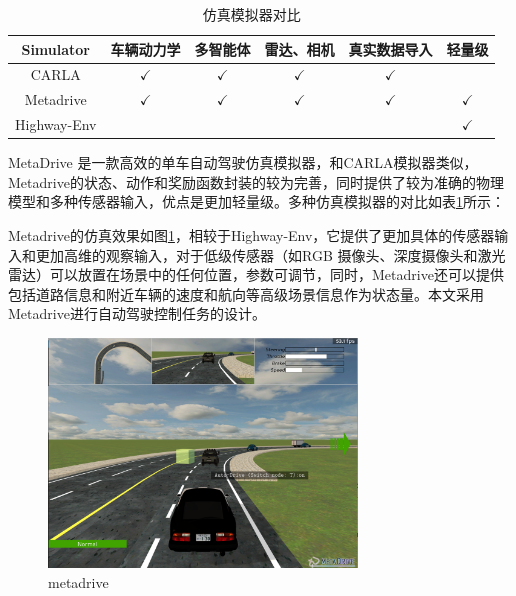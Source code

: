 \begin{table}[htbp]
    \caption{仿真模拟器对比}\label{仿真模拟器对比}
    \centering
    \renewcommand\arraystretch{1.5}
    \begin{tabular}{|c|c|c|c|c|c|}
    \hline
    Simulator   & 车辆动力学        & 多智能体       & 雷达、相机       & 真实数据导入       & 轻量级          \\ \hline
    CARLA\cite{Dosovitskiy17}       & $\checkmark$ & $\checkmark$ & $\checkmark$ & $\checkmark$ &              \\ \hline
    Metadrive\cite{li2021metadrive}   & $\checkmark$ & $\checkmark$ & $\checkmark$ & $\checkmark$ & $\checkmark$ \\ \hline
    Highway-Env\cite{highway-env} &              &              &              &              & $\checkmark$ \\ \hline
    \end{tabular}
\end{table}

MetaDrive 是一款高效的单车自动驾驶仿真模拟器\cite{li2021metadrive}，和CARLA模拟器\cite{Dosovitskiy17}类似，Metadrive的状态、动作和奖励函数封装的较为完善，同时提供了较为准确的物理模型和多种传感器输入，优点是更加轻量级。多种仿真模拟器的对比如表\ref{仿真模拟器对比}所示：

Metadrive的仿真效果如图\ref{metadrive}，相较于Highway-Env，它提供了更加具体的传感器输入和更加高维的观察输入，对于低级传感器（如RGB 摄像头、深度摄像头和激光雷达）可以放置在场景中的任何位置，参数可调节，同时，Metadrive还可以提供包括道路信息和附近车辆的速度和航向等高级场景信息作为状态量。本文采用Metadrive进行自动驾驶控制任务的设计。

\begin{figure}[htbp]
    \vspace{13pt} %
    \centering
    \includegraphics[width=0.73\textwidth]{images/chapter3/metadrive.png}%
    \caption{metadrive}\label{metadrive} %
\end{figure}  

